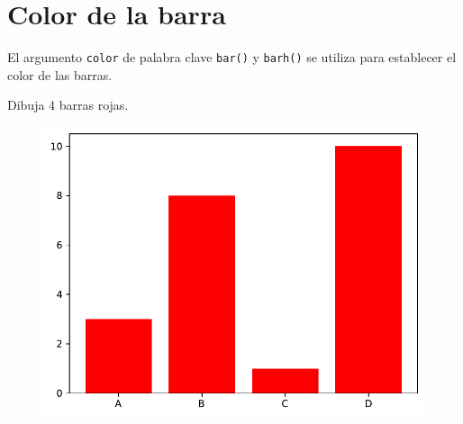 \section{Color de la barra}

El argumento \texttt{color} de palabra clave \texttt{bar()} y
\texttt{barh()} se utiliza para establecer el color de las barras.

\begin{code} Dibuja 4 barras rojas.

\begin{Shaded}
\begin{Highlighting}[]

\OperatorTok{=}\NormalTok{ np.array([}\NormalTok{, }\NormalTok{, }\NormalTok{, }\NormalTok{])}
\OperatorTok{=}\NormalTok{ np.array([}\NormalTok{, }\NormalTok{, }\NormalTok{, }\NormalTok{])}

\OperatorTok{=} \NormalTok{)}
\end{Highlighting}
\end{Shaded}

\begin{figure}
  \centering
  \includegraphics[scale=0.6]{img/grafica1047.pdf}
\end{figure}
\end{code}

